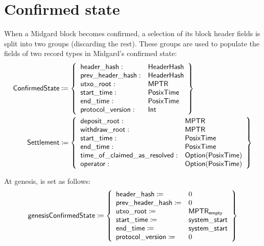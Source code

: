 \documentclass[../midgard.tex]{subfiles}
\begin{document}
\section{Confirmed state}
\label{h:confirmed-state}

When a Midgard block becomes confirmed, a selection of its block header fields is split into two groups (discarding the rest).
These groups are used to populate the fields of two record types in Midgard's confirmed state:
\begingroup
\allowdisplaybreaks
\begin{align*}
    \mathsf{ConfirmedState} &\coloneq \left\{
    \begin{array}{ll}
        \mathsf{header\_hash} : & \mathsf{HeaderHash} \\
        \mathsf{prev\_header\_hash} : & \mathsf{HeaderHash} \\
        \mathsf{utxo\_root} : & \mathsf{MPTR} \\
        \mathsf{start\_time} : & \mathsf{PosixTime} \\
        \mathsf{end\_time} : & \mathsf{PosixTime} \\
        \mathsf{protocol\_version} : & \mathsf{Int} \\
    \end{array} \right\} \\
    \mathsf{Settlement} &\coloneq \left\{
    \begin{array}{ll}
        \mathsf{deposit\_root} : & \mathsf{MPTR} \\
        \mathsf{withdraw\_root} : & \mathsf{MPTR} \\
        \mathsf{start\_time}: & \mathsf{PosixTime} \\
        \mathsf{end\_time}: & \mathsf{PosixTime} \\
        \mathsf{time\_of\_claimed\_as\_resolved}: & \mathsf{Option}(\mathsf{PosixTime}) \\
        \mathsf{operator}: & \mathsf{Option}(\mathsf{PosixTime})
    \end{array} \right\}
\end{align*}
\endgroup

At genesis,  is set as follows:
\begin{equation*}
    \mathsf{genesisConfirmedState} \coloneq \left\{
        \begin{array}{ll}
            \mathsf{header\_hash} \coloneq & 0 \\
            \mathsf{prev\_header\_hash} \coloneq & 0 \\
            \mathsf{utxo\_root} \coloneq & \mathsf{MPTR}_{\mathsf{empty}} \\
            \mathsf{start\_time} \coloneq & \mathsf{system\_start} \\
            \mathsf{end\_time} \coloneq & \mathsf{system\_start} \\
            \mathsf{protocol\_version} \coloneq & 0
        \end{array} \right\}
\end{equation*}
\end{document}
